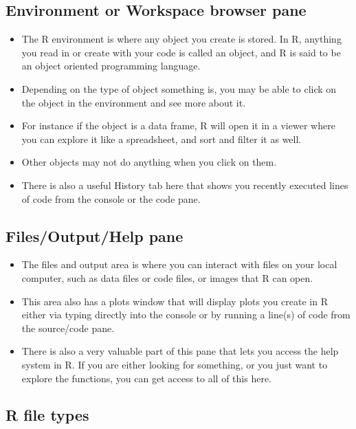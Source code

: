 \documentclass[
]{book}
\begin{document}
\hypertarget{environment-or-workspace-browser-pane}{%
\subsection{Environment or Workspace browser pane}\label{environment-or-workspace-browser-pane}}

\begin{itemize}
\item
  The R environment is where any object you create is stored. In R, anything you read in or create with your code is called an object, and R is said to be an object oriented programming language.
\item
  Depending on the type of object something is, you may be able to click on the object in the environment and see more about it.
\item
  For instance if the object is a data frame, R will open it in a viewer where you can explore it like a spreadsheet, and sort and filter it as well.
\item
  Other objects may not do anything when you click on them.
\item
  There is also a useful History tab here that shows you recently executed lines of code from the console or the code pane.
\end{itemize}

\hypertarget{filesoutputhelp-pane}{%
\subsection{Files/Output/Help pane}\label{filesoutputhelp-pane}}

\begin{itemize}
\item
  The files and output area is where you can interact with files on your local computer, such as data files or code files, or images that R can open.
\item
  This area also has a plots window that will display plots you create in R either via typing directly into the console or by running a line(s) of code from the source/code pane.
\item
  There is also a very valuable part of this pane that lets you access the help system in R. If you are either looking for something, or you just want to explore the functions, you can get access to all of this here.
\end{itemize}

\hypertarget{r-file-types}{%
\subsection{R file types}\label{r-file-types}}
\end{document}
